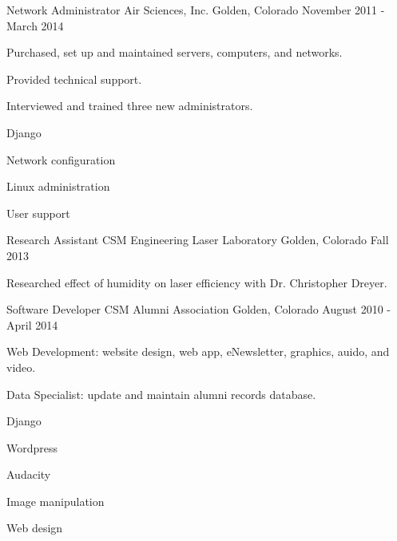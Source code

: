 \begin{cventries}
  \cventry
    {Network Administrator} %
    {Air Sciences, Inc.} %
    {Golden, Colorado} %
    {November 2011 - March 2014} %
    {
      \begin{cvitems} %
        \item {Purchased, set up and maintained servers, computers, and networks.}
        \item {Provided technical support.}
        \item {Interviewed and trained three new administrators.}
      \end{cvitems}
    }
    \begin{cventryskills}
      \item Django
      \item Network configuration
      \item Linux administration
      \item User support
    \end{cventryskills}

  \cventry
    {Research Assistant} %
    {CSM Engineering Laser Laboratory} %
    {Golden, Colorado} %
    {Fall 2013} %
    {
      \begin{cvitems} %
        \item {Researched effect of humidity on laser efficiency with Dr. Christopher Dreyer.}
      \end{cvitems}
    }

  \cventry
    {Software Developer} %
    {CSM Alumni Association} %
    {Golden, Colorado} %
    {August 2010 - April 2014} %
    {
      \begin{cvitems} %
        \item {Web Development: website design, web app, eNewsletter, graphics, auido, and video.}
        \item {Data Specialist: update and maintain alumni records database.}
      \end{cvitems}
    }
    \begin{cventryskills}
      \item Django
      \item Wordpress
      \item Audacity
      \item Image manipulation
      \item Web design
    \end{cventryskills}


\end{cventries}
